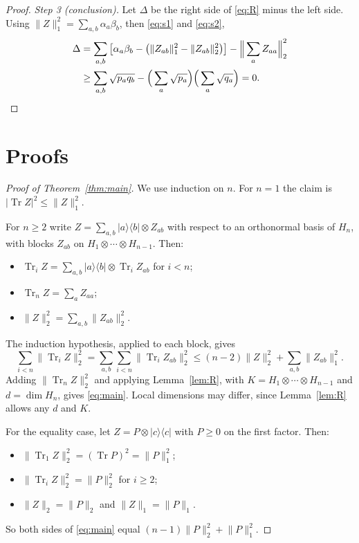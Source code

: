 \documentclass[11pt]{article}
\theoremstyle{remark}
\newcommand{\Tr}{\operatorname{Tr}}
\newcommand{\norm}[1]{\lVert #1\rVert}
\begin{document}
\begin{proof}
\emph{Step 3 (conclusion).} Let $\Delta$ be the right side of \eqref{eq:R} minus the left side. Using
$\norm{Z}_1^2=\sum_{a,b}\alpha_a\beta_b$, then \eqref{eq:s1} and \eqref{eq:s2},
\begin{align*}
\Delta&=\sum_{a,b}\big[\alpha_a\beta_b-\big(\norm{Z_{ab}}_1^2-\norm{Z_{ab}}_2^2\big)\big]-\Big\|\sum_aZ_{aa}\Big\|_2^2\\
&\ge\sum_{a,b}\sqrt{p_aq_b}-\Big(\sum_a\sqrt{p_a}\Big)\Big(\sum_a\sqrt{q_a}\Big)=0. \qedhere
\end{align*}
\end{proof}

\section{Proofs}

\begin{proof}[Proof of Theorem~\ref{thm:main}]
We use induction on $n$. For $n=1$ the claim is $|\Tr Z|^2\le\norm{Z}_1^2$.

For $n\ge2$ write $Z=\sum_{a,b}|a\rangle\langle b|\otimes Z_{ab}$ with respect to an orthonormal basis of $H_n$, with
blocks $Z_{ab}$ on $H_1\otimes\cdots\otimes H_{n-1}$. Then:
\begin{itemize}
\item $\Tr_iZ=\sum_{a,b}|a\rangle\langle b|\otimes\Tr_iZ_{ab}$ for $i<n$;
\item $\Tr_nZ=\sum_aZ_{aa}$;
\item $\norm{Z}_2^2=\sum_{a,b}\norm{Z_{ab}}_2^2$.
\end{itemize}
The induction hypothesis, applied to each block, gives
\[
\sum_{i<n}\norm{\Tr_iZ}_2^2=\sum_{a,b}\sum_{i<n}\norm{\Tr_iZ_{ab}}_2^2\le(n-2)\norm{Z}_2^2+\sum_{a,b}\norm{Z_{ab}}_1^2.
\]
Adding $\norm{\Tr_nZ}_2^2$ and applying Lemma~\ref{lem:R}, with $K=H_1\otimes\cdots\otimes H_{n-1}$ and $d=\dim H_n$,
gives \eqref{eq:main}. Local dimensions may differ, since Lemma~\ref{lem:R} allows any $d$ and $K$.

For the equality case, let $Z=P\otimes|c\rangle\langle c|$ with $P\ge0$ on the first factor. Then:
\begin{itemize}
\item $\norm{\Tr_1Z}_2^2=(\Tr P)^2=\norm{P}_1^2$;
\item $\norm{\Tr_iZ}_2^2=\norm{P}_2^2$ for $i\ge2$;
\item $\norm{Z}_2=\norm{P}_2$ and $\norm{Z}_1=\norm{P}_1$.
\end{itemize}
So both sides of \eqref{eq:main} equal $(n-1)\norm{P}_2^2+\norm{P}_1^2$.
\end{proof}
\end{document}
